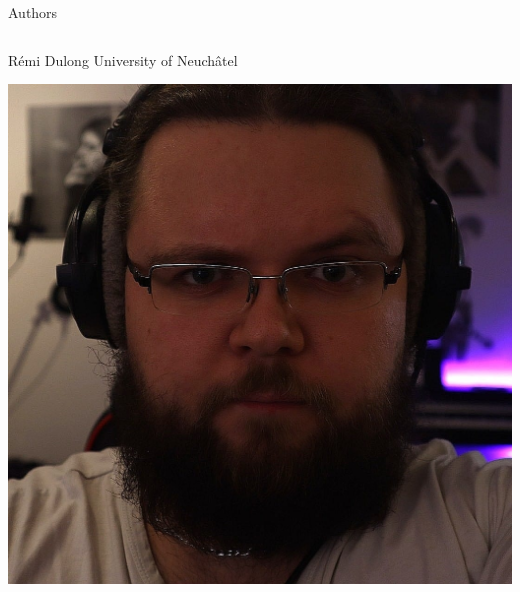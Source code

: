 \documentclass[presentation]{beamer}
\begin{document}
\begin{frame}[label={sec:org103b257}]{Authors}
\fontsize{5pt}{7pt}\\

\begin{block}{}
\begin{columns}
\begin{column}{0.2\columnwidth}
\begin{block}{Rémi Dulong}
University of Neuchâtel\\
\begin{center}
\includegraphics[width=.9\linewidth]{./IMGs/remi.jpg}
\end{center}
\end{block}
\end{column}


\end{columns}
\end{block}
\end{frame}
\end{document}
